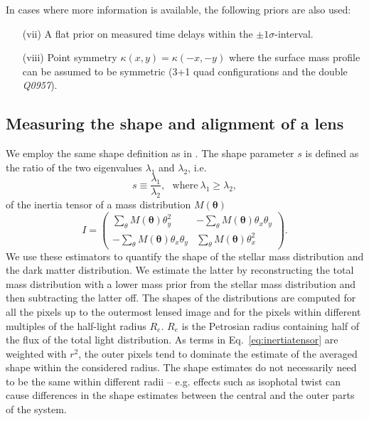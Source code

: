 \documentclass[useAMS,usenatbib]{mn2e}
\begin{document}
In cases where more information is available, the following priors are also used:

\begin{enumerate}
\item[(vii)] A flat prior on measured time delays within the $\pm 1\sigma$-interval.


\item[(viii)] Point symmetry $\kappa(x,y) = \kappa(-x,-y)$ where 
the surface mass profile can be assumed to be symmetric (3+1 quad
configurations and the double \textit{Q0957}).

\end{enumerate}

\subsection{Measuring the shape and alignment of a lens}\label{sec:shapemethod}
We employ the same shape definition as in \citep{2014arXiv1401.7990C}. The shape parameter $s$ is defined as the ratio of the two eigenvalues $\lambda_1$ and $\lambda_2$, i.e.
\begin{equation}\label{eq:shapeestimate}
    s \equiv \frac{\lambda_{1}}{\lambda_{2}}, \ \ \ \mathrm{where} \ \lambda_{1} \geq \lambda_{2},
\end{equation}
of the inertia tensor of a mass distribution $M(\boldsymbol{\theta})$
\begin{equation}\label{eq:inertiatensor}
    I = \begin{pmatrix} \sum_\theta M(\boldsymbol{\theta})\theta^{2}_{y} & -\sum_\theta M(\boldsymbol{\theta})\theta_{x}\theta_{y} \\
                        -\sum_\theta M(\boldsymbol{\theta})\theta_{x}\theta_{y} & \sum_\theta M(\boldsymbol{\theta})\theta^{2}_{x} \end{pmatrix}.
\end{equation}
We use these estimators to quantify the shape of the stellar mass distribution and the dark matter distribution. We estimate the latter by reconstructing the total mass distribution with a lower mass prior from the stellar mass distribution and then subtracting the latter off. The shapes of the distributions are computed for all the pixels up to the outermost lensed image and for the pixels within different multiples of the half-light radius $R_e$. $R_e$ is the Petrosian radius containing half of the flux of the total light distribution. As terms in Eq.~\ref{eq:inertiatensor} are weighted with $r^2$, the outer pixels tend to dominate the estimate of the averaged shape within the considered radius. The shape estimates do not necessarily need to be the same within different radii -- e.g. effects such as isophotal twist \citep[e.g.][and references therein]{1978ComAp...8...27B} can cause differences in the shape estimates between the central and the outer parts of the system.
\end{document}

